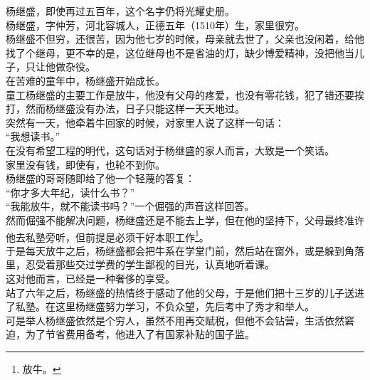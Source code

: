 \begin{multicols}{\theparacolNo}
杨继盛，即使再过五百年，这个名字仍将光耀史册。\\

杨继盛，字仲芳，河北容城人，正德五年（1510年）生，家里很穷。\\

杨继盛不但穷，还很苦，因为他七岁的时候，母亲就去世了，父亲也没闲着，给他找了个继母，更不幸的是，这位继母也不是省油的灯，缺少博爱精神，没把他当儿子，只让他做杂役。\\

在苦难的童年中，杨继盛开始成长。\\

童工杨继盛的主要工作是放牛，他没有父母的疼爱，也没有零花钱，犯了错还要挨打，然而杨继盛没有办法，日子只能这样一天天地过。\\

突然有一天，他牵着牛回家的时候，对家里人说了这样一句话：\\

“我想读书。”\\

在没有希望工程的明代，这句话对于杨继盛的家人而言，大致是一个笑话。\\

家里没有钱，即使有，也轮不到你。\\

杨继盛的哥哥随即给了他一个轻蔑的答复：\\

“你才多大年纪，读什么书？”\\

“我能放牛，就不能读书吗？”一个倔强的声音这样回答。\\

然而倔强不能解决问题，杨继盛还是不能去上学，但在他的坚持下，父母最终准许他去私塾旁听，但前提是必须干好本职工作\footnote{放牛。}。\\

于是每天放牛之后，杨继盛都会把牛系在学堂门前，然后站在窗外，或是躲到角落里，忍受着那些交过学费的学生鄙视的目光，认真地听着课。\\

这对他而言，已经是一种奢侈的享受。\\

站了六年之后，杨继盛的热情终于感动了他的父母，于是他们把十三岁的儿子送进了私塾。在这里杨继盛努力学习，不负众望，先后考中了秀才和举人。\\

可是举人杨继盛依然是个穷人，虽然不用再交赋税，但他不会钻营，生活依然窘迫，为了节省费用备考，他进入了有国家补贴的国子监。\\


\end{multicols}
